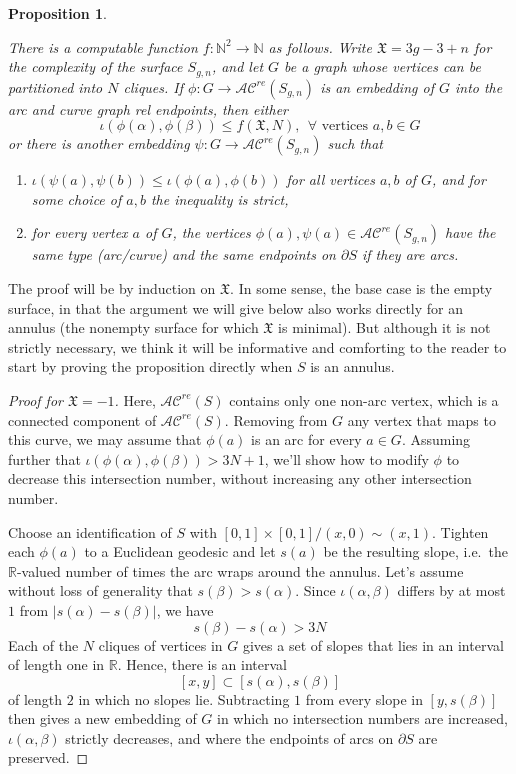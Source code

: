 \documentclass[11pt]{amsart}
\newtheorem{proposition}[theorem]{Proposition}
\theoremstyle{remark}
\numberwithin{equation}{section}
\newcommand{\N}{\mathbb{N}}
\newcommand{\R}{\mathbb{R}}
\newcommand{\cAC}{\mathcal{AC}}
\newcommand{\acre}{\cAC^{re}}
\begin{document}
\begin{proposition}
\label{technical lemma}

There is a computable function $f:\N^2\to\N$ as follows. Write $\mathfrak X= 3g-3+n$ for the  complexity of the surface $S_{g,n}$, and let $G$  be a graph whose vertices can be partitioned into  $N$ cliques. 
If $\phi : G \longrightarrow \acre(S_{g,n})$ is an embedding of $G$ into the arc and curve graph rel endpoints, then either
 $$\iota	  (\phi(\alpha),\phi(\beta)  ) \leq f(\mathfrak X,N), \ \ \forall \text{ vertices }  a,b \in G$$ or  there is another embedding $\psi : G \longrightarrow \acre(S_{g,n})$ such that 
 \begin{enumerate}
 \item $\iota (\psi(a),\psi(b)  ) \leq \iota	  (\phi(a),\phi(b)  ) $  for all vertices $a,b$ of $G$, and for \emph{some} choice of $a,b$ the inequality is strict,
 \item  for every vertex $a $ of $G$, the vertices $\phi(a),\psi(a) \in \acre(S_{g,n})$  have the same type (arc/curve) and the same endpoints on $\partial S$  if they are arcs.
\end {enumerate}
\end{proposition}


The proof will be by induction on $\mathfrak X$.  In some sense, the base case is the empty surface, in that the argument we will give below also works directly for an annulus (the  nonempty surface for which $\mathfrak X$ is minimal). But although it is not strictly necessary, we think it will be informative and comforting to the reader to start by proving the proposition  directly when $S$ is an annulus.

\begin{proof}[Proof for $\mathfrak X=-1$] Here, $\cAC^{re}(S)$ contains only one non-arc vertex, which is a connected component of $\cAC^{re}(S)$. Removing from $G$ any vertex that maps to this curve, we may assume that $\phi(a)$ is an arc for every $a \in G$.  Assuming further that $\iota(\phi(\alpha),\phi(\beta)) > 3N+1$, we'll show how to modify $\phi$  to decrease this intersection number, without increasing any other intersection number.

Choose an identification of $S$ with $[0,1]\times [0,1] / (x,0) \sim (x,1)$. Tighten each $\phi(a)$ to a Euclidean geodesic and let $s(a)$ be the resulting slope, i.e.\ the $\R$-valued number of times the arc wraps around the annulus. Let's assume without loss of generality that $s(\beta)>s(\alpha)$. Since $\iota( \alpha, \beta)$ differs by at most $1$ from $|s(\alpha) - s(\beta) |$, we have $$s(\beta)-s(\alpha)>3N$$ 
Each of the $N$ cliques of vertices in $G$ gives a set of slopes that lies in an interval of length one in $\R$. Hence, there is an interval $$[x,y] \subset [s(\alpha),s(\beta)]$$ of length $2$ in which no slopes lie. Subtracting $1$ from every slope in $[y,s(\beta)]$ then gives a new embedding of $G$ in which no intersection numbers are increased, $\iota(\alpha,\beta)$ strictly decreases, and where the endpoints of arcs on $\partial S$ are preserved.
\end{proof} 
\end{document}
